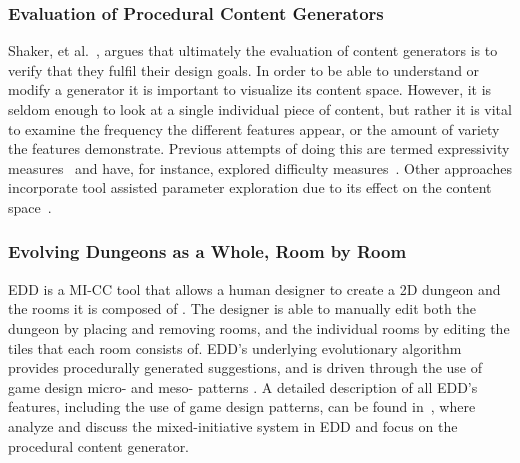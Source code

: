 \subsubsection{Evaluation of Procedural Content Generators}
Shaker, et al.~, argues that ultimately the evaluation of content generators is to verify that they fulfil their design goals. In order to be able to understand or modify a generator it is important to visualize its content space. However, it is seldom enough to look at a single individual piece of content, but rather it is vital to examine the frequency the different features appear, or the amount of variety the features demonstrate. Previous attempts of doing this are termed expressivity measures~ and have, for instance, explored difficulty measures~. Other approaches incorporate tool assisted parameter exploration due to its effect on the content space~.


\subsubsection{Evolving Dungeons as a Whole, Room by Room}


EDD is a MI-CC tool that allows a human designer to create a 2D dungeon and the rooms it is composed of%
. The designer is able to manually edit both the dungeon by placing and removing rooms, and the individual rooms by  editing the tiles %
that each room consists of. EDD's underlying evolutionary algorithm provides procedurally generated suggestions, and is driven through the use of game design micro- and meso- patterns%
. A detailed description of all EDD's features, including the use of game design patterns, can be found in~, where  analyze and discuss the mixed-initiative system in EDD and  focus on the procedural content generator.

